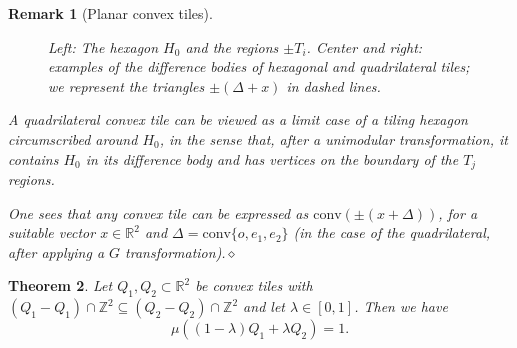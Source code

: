 \documentclass[11pt, a4paper]{amsart}
\newcommand{\RR}{\mathbb{R}}
\newcommand{\ZZ}{\mathbb{Z}}
\newcommand{\conv}{\mathrm{conv}}
\newcommand{\origin}{o}
\numberwithin{equation}{section}
\theoremstyle{plain}
\newtheorem{theorem}{Theorem}[section]
\newtheorem{remark}[theorem]{Remark}
\begin{document}
\begin{remark}[Planar convex tiles]
\begin{figure}[!h]
\begin{minipage}{0.25\textwidth}
	\end{minipage}
	\hspace{0.05\textwidth}
	\begin{minipage}{0.25\textwidth}
	\end{minipage}
	\caption{Left: The hexagon $H_0$ and the regions $\pm T_i$. Center and right: examples of the difference bodies of hexagonal and quadrilateral tiles; we represent the triangles $\pm (\Delta +x)$ in dashed lines.}
	\label{fig:tiles}
\end{figure}

A quadrilateral convex tile can be viewed as a limit case of a tiling hexagon circumscribed around $H_0$, in the sense that, after a unimodular transformation, it contains $H_0$ in its difference body and has vertices on the boundary of the $T_j$ regions.

One sees that any convex tile can be expressed as $\conv( \pm( x + \Delta) ) $, for a suitable vector $x\in\RR^2$ and $\Delta = \conv\{\origin, e_1, e_2\}$ (in the case of the quadrilateral, after applying a $G$ transformation).\hfill $\diamond$
\end{remark}


\begin{theorem}
\label{thm:tile_covering_text}
Let $Q_1,Q_2\subset\RR^2$ be convex tiles with $(Q_1-Q_1)\cap\ZZ^2 \subseteq (Q_2-Q_2)\cap\ZZ^2$ and let $\lambda\in [0,1]$. Then we have
\[\mu( (1-\lambda)Q_1 + \lambda Q_2) = 1.\]
\end{theorem}
\end{document}
